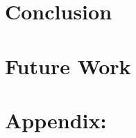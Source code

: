 \documentclass[hidelinks, 12pt]{article} %
\begin{document}
% 

\newpage
\section{Conclusion}
\label{sec:conc}

\pagebreak

\newpage
\section{Future Work}
\label{sec:future}

\pagebreak

\newpage
\appendix

\section{Appendix: }
\label{sec:App_}

\pagebreak

\newpage



\newpage

\pagebreak
\end{document}
